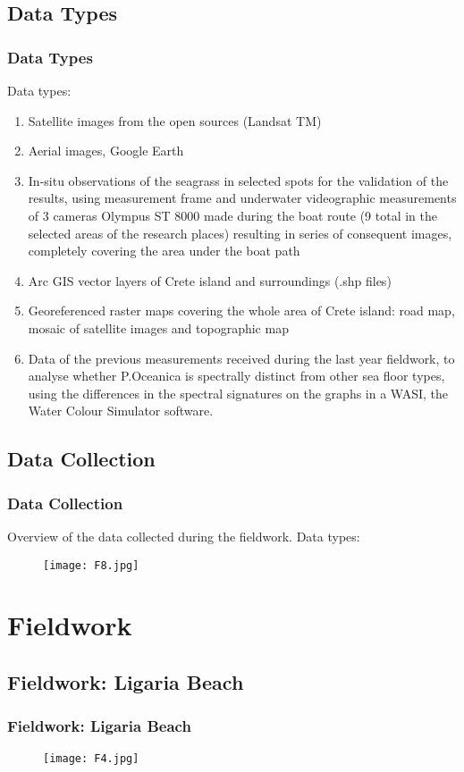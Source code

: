 \documentclass[pdflatex,compress]{beamer}
\begin{document}
\subsection{Data Types}
\begin{frame}\frametitle{Data Types}
Data types:
\footnotesize{\begin{enumerate}
	\item Satellite images from the open sources (Landsat TM)
	\item Aerial images, Google Earth
	\item In-situ observations of the seagrass in selected spots for the validation of the results, using measurement frame and underwater videographic measurements of 3 cameras Olympus ST 8000 made during the boat route (9 total in the selected areas of the research places) resulting in series of consequent images, completely covering the area under the boat path
	\item Arc GIS vector layers of Crete island and surroundings (.shp files)
	\item Georeferenced raster maps covering the whole area of Crete island: road
map, mosaic of satellite images and topographic map
	\item Data of the previous measurements received during the last year fieldwork, to analyse whether P.Oceanica is spectrally distinct from other sea floor types, using the differences in the spectral signatures on the graphs in a WASI, the Water Colour Simulator software.
\end{enumerate} }
\end{frame}

\subsection{Data Collection}
\begin{frame}\frametitle{Data Collection}
\scriptsize{Overview of the data collected during the fieldwork. Data types:}
\begin{figure}[H]
	\centering
		\texttt{[image: F8.jpg]}
\end{figure}
\end{frame}

\section{Fieldwork}
\subsection{Fieldwork: Ligaria Beach}
\begin{frame}\frametitle{Fieldwork: Ligaria Beach}
\begin{figure}[H]
	\centering
		\texttt{[image: F4.jpg]}
\end{figure}
\end{frame}
\end{document}
